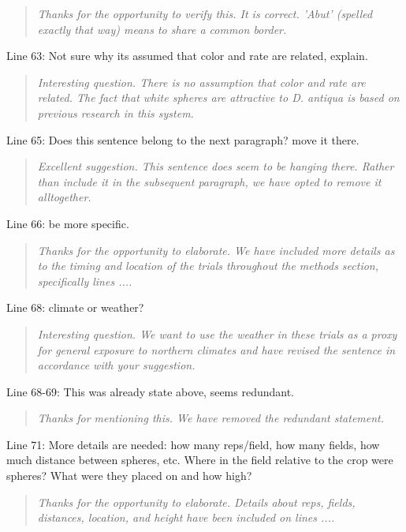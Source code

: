 \documentclass{article}
\begin{document}
\begin{quote}
    \textit{Thanks for the opportunity to verify this.  It is correct.  'Abut' (spelled exactly that way) means to share a common border. }
\end{quote}

Line 63: Not sure why its assumed that color and rate are related, explain.  

\begin{quote}
    \textit{Interesting question.  There is no assumption that color and rate are related.  The fact that white spheres are attractive to \textit{D. antiqua} is based on previous research in this system.  }
\end{quote}

Line 65: Does this sentence belong to the next paragraph? move it there.

\begin{quote}
    \textit{Excellent suggestion.  This sentence does seem to be hanging there.  Rather than include it in the subsequent paragraph, we have opted to remove it alltogether.  }
\end{quote}

Line 66: be more specific.  

\begin{quote}
    \textit{Thanks for the opportunity to elaborate.  We have included more details as to the timing and location of the trials throughout the methods section, specifically lines .... }
\end{quote}


Line 68: climate or weather?

\begin{quote}
    \textit{Interesting question.  We want to use the weather in these trials as a proxy for general exposure to northern climates and have revised the sentence in accordance with your suggestion.  }
\end{quote}


Line 68-69: This was already state above, seems redundant.

\begin{quote}
    \textit{Thanks for mentioning this.  We have removed the redundant statement.  }
\end{quote}

Line 71: More details are needed: how many reps/field, how many fields, how much distance between spheres, etc. Where in the field relative to the crop were spheres? What were they placed on and how high?

\begin{quote}
    \textit{Thanks for the opportunity to elaborate.  Details about reps, fields, distances, location, and height have been included on lines ....}
\end{quote}
\end{document}
